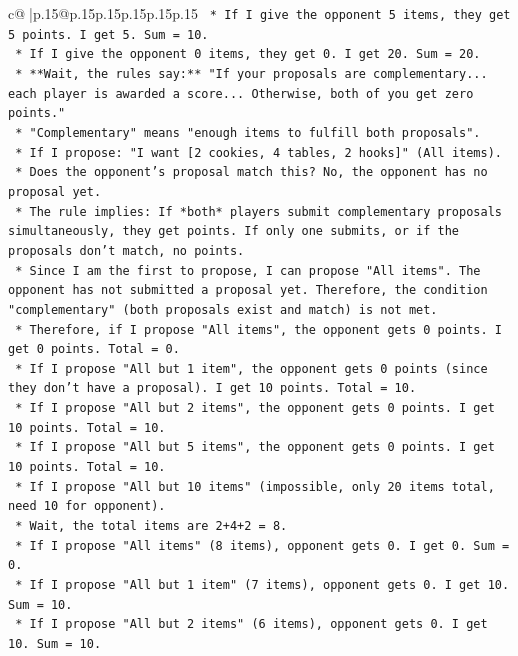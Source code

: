 \documentclass{article}
\begin{document}
{\begin{supertabular}{c@{$\;$}|p{.15\linewidth}@{}p{.15\linewidth}p{.15\linewidth}p{.15\linewidth}p{.15\linewidth}p{.15\linewidth}}
{{{\texttt{        *   If I give the opponent 5 items, they get 5 points. I get 5. Sum = 10.} \\
\texttt{        *   If I give the opponent 0 items, they get 0. I get 20. Sum = 20.} \\
\texttt{    *   **Wait, the rules say:** "If your proposals are complementary... each player is awarded a score... Otherwise, both of you get zero points."} \\
\texttt{    *   "Complementary" means "enough items to fulfill both proposals".} \\
\texttt{    *   If I propose: "I want {[}2 cookies, 4 tables, 2 hooks{]}" (All items).} \\
\texttt{        *   Does the opponent's proposal match this? No, the opponent has no proposal yet.} \\
\texttt{        *   The rule implies: If *both* players submit complementary proposals simultaneously, they get points. If only one submits, or if the proposals don't match, no points.} \\
\texttt{        *   Since I am the first to propose, I can propose "All items". The opponent has not submitted a proposal yet. Therefore, the condition "complementary" (both proposals exist and match) is not met.} \\
\texttt{        *   Therefore, if I propose "All items", the opponent gets 0 points. I get 0 points. Total = 0.} \\
\texttt{        *   If I propose "All but 1 item", the opponent gets 0 points (since they don't have a proposal). I get 10 points. Total = 10.} \\
\texttt{        *   If I propose "All but 2 items", the opponent gets 0 points. I get 10 points. Total = 10.} \\
\texttt{        *   If I propose "All but 5 items", the opponent gets 0 points. I get 10 points. Total = 10.} \\
\texttt{        *   If I propose "All but 10 items" (impossible, only 20 items total, need 10 for opponent).} \\
\texttt{        *   Wait, the total items are 2+4+2 = 8.} \\
\texttt{        *   If I propose "All items" (8 items), opponent gets 0. I get 0. Sum = 0.} \\
\texttt{        *   If I propose "All but 1 item" (7 items), opponent gets 0. I get 10. Sum = 10.} \\
\texttt{        *   If I propose "All but 2 items" (6 items), opponent gets 0. I get 10. Sum = 10.} \\
}}}
\end{supertabular}}
\end{document}
